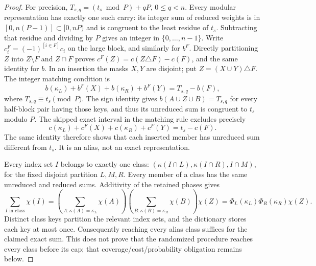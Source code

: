 \begin{proof}
For precision, $T_{s,q}=(t_s\bmod P)+qP$, $0\le q<n$.
Every modular representation has exactly one such carry: its integer
sum of reduced weights is in $[0,n(P-1)]\subset[0,nP)$ and is congruent
to the least residue of $t_s$. Subtracting that residue and dividing
by $P$ gives an integer in $\{0,\ldots,n-1\}$.
Write $c^F_i=(-1)^{[i\in F]}c_i$ on the large block, and similarly
for $b^F$. Directly partitioning $Z$ into $Z\setminus F$ and
$Z\cap F$ proves
$c^F(Z)=c(Z\triangle F)-c(F)$, and the same identity for $b$.
In an insertion the masks $X,Y$ are disjoint; put
$Z=(X\cup Y)\triangle F$. The integer matching condition is
\[
 b(\kappa_L)+b^F(X)+b(\kappa_R)+b^F(Y)
       =T_{s,q}-b(F),
\]
where $T_{s,q}\equiv t_s\pmod P$. The sign identity gives
$b(A\cup Z\cup B)=T_{s,q}$ for every half-block pair having those
keys, and thus its unreduced sum is congruent to $t_s$ modulo $P$.
The skipped exact interval in the matching rule excludes precisely
\[
 c(\kappa_L)+c^F(X)+c(\kappa_R)+c^F(Y)=t_s-c(F).
\]
The same identity therefore shows that each inserted member has
unreduced sum different from $t_s$. It is an alias, not an exact
representation.

Every index set $I$ belongs to exactly one class:
$(\kappa(I\cap L),\kappa(I\cap R),I\cap M)$, for the fixed disjoint
partition $L,M,R$. Every member of a class has the same unreduced
and reduced sums. Additivity of the retained phases gives
\[
 \sum_{I\text{ in class}}\chi(I)
 =\left(\sum_{A:\kappa(A)=\kappa_L}\chi(A)\right)
  \left(\sum_{B:\kappa(B)=\kappa_R}\chi(B)\right)\chi(Z)
 =\Phi_L(\kappa_L)\Phi_R(\kappa_R)\chi(Z).
\]
Distinct class keys partition the relevant index sets, and the
dictionary stores each key at most once. Consequently reaching every
alias class suffices for the claimed exact sum. This does not prove
that the randomized procedure reaches every class before its cap;
that coverage/cost/probability obligation remains below.
\end{proof}

